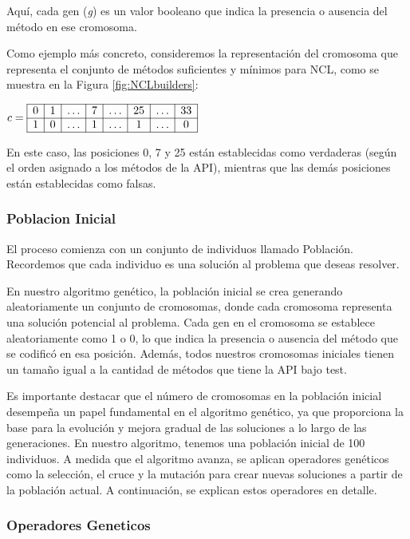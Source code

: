 Aquí, cada gen (\emph{g}) es un valor booleano que indica la presencia o ausencia del método en ese cromosoma.

Como ejemplo más concreto, consideremos la representación del cromosoma que representa el conjunto de métodos suficientes y mínimos para NCL, como se muestra en la Figura \ref{fig:NCLbuilders}:
\begin{center}
$c = \begin{array}{|*{8}{c|}}
\hline
0 & 1 & \ldots & 7 & \ldots & 25 & \ldots & 33 \\
\hline
1 & 0 & \ldots & 1 & \ldots & 1 & \ldots & 0 \\
\hline
\end{array}$
\end{center}

En este caso, las posiciones 0, 7 y 25 están establecidas como verdaderas (según el orden asignado a los métodos de la API), mientras que las demás posiciones están establecidas como falsas.


\subsubsection{Poblacion Inicial}

El proceso comienza con un conjunto de individuos llamado Población. Recordemos que cada individuo es una solución al problema que deseas resolver.

En nuestro algoritmo genético, la población inicial se crea generando aleatoriamente un conjunto de cromosomas, donde cada cromosoma representa una solución potencial al problema. Cada gen en el cromosoma se establece aleatoriamente como 1 o 0, lo que indica la presencia o ausencia del método que se codificó en esa posición. Además, todos nuestros cromosomas iniciales tienen un tamaño igual a la cantidad de métodos que tiene la API bajo test.

Es importante destacar que el número de cromosomas en la población inicial desempeña un papel fundamental en el algoritmo genético, ya que proporciona la base para la evolución y mejora gradual de las soluciones a lo largo de las generaciones. En nuestro algoritmo, tenemos una población inicial de 100 individuos. A medida que el algoritmo avanza, se aplican operadores genéticos como la selección, el cruce y la mutación para crear nuevas soluciones a partir de la población actual. A continuación, se explican estos operadores en detalle.

\subsubsection{Operadores Geneticos}

